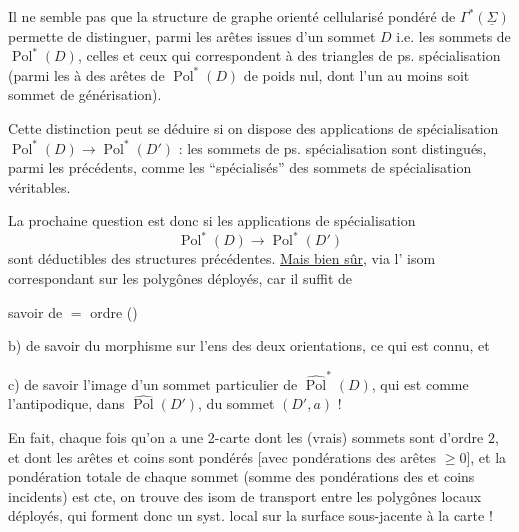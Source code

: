 
Il ne semble pas que la structure de graphe orienté cellularisé pondéré de $\Gamma^*(\underline\Sigma)$ permette de distinguer, parmi les  arêtes issues d'un sommet $D$ i.e. les sommets de $\operatorname{Pol}^*(D)$, celles et ceux qui correspondent à des triangles de ps. spécialisation (parmi les   à des arêtes  de $\operatorname{Pol}^*(D)$ de poids nul, dont  l'un au moins soit sommet de générisation).


Cette distinction peut se déduire si on dispose des applications de spécialisation  $\operatorname{Pol}^*(D)\longrightarrow\operatorname{Pol}^*(D')$ : les sommets de ps. spécialisation sont distingués, parmi les précédents, comme  les ``spécialisés'' des sommets de spécialisation véritables.

La prochaine question est donc si les applications de spécialisation
\[
\operatorname{Pol}^*(D)\longrightarrow\operatorname{Pol}^*(D')
\]
sont déductibles des structures précédentes. \uline{Mais bien sûr}, via l' isom correspondant sur les polygônes déployés, car il suffit de

 savoir  de $=$ ordre ()

b) de savoir  du morphisme sur l'ens des deux orientations, ce qui est connu, et

c) de savoir l'image d'un sommet particulier  de $\widehat{\operatorname{Pol}}^*(D)$, qui est  comme l'antipodique, dans $\widehat{\operatorname{Pol}}(D')$, du sommet $(D',a)$ !

En fait, chaque fois qu'on a une 2-carte  dont les  (vrais) sommets sont d'ordre $2$, et dont les arêtes et coins sont pondérés [avec pondérations des arêtes $\ge0$],  et la pondération totale de chaque sommet  (somme des pondérations des   et coins incidents) est cte, on trouve des isom de transport entre les polygônes locaux déployés, qui forment donc un syst. local sur la surface sous-jacente à la carte !
